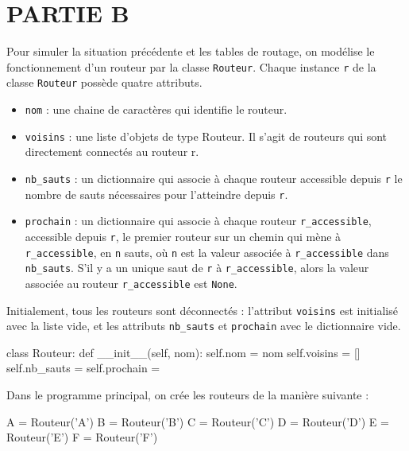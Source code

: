 \medskip

\section*{PARTIE B}

\medskip

Pour simuler la situation précédente et les tables de routage, on modélise le fonctionnement d’un routeur par la classe \verb|Routeur|. Chaque instance \verb|r| de la classe \verb|Routeur| possède quatre attributs.

\begin{itemize}
    \item \verb|nom| : une chaine de caractères qui identifie le routeur.
    \item \verb|voisins| : une liste d’objets de type Routeur. Il s’agit de routeurs qui sont directement connectés au routeur r.
    \item \verb|nb_sauts| : un dictionnaire qui associe à chaque routeur accessible depuis \verb|r| le nombre de sauts nécessaires pour l’atteindre depuis \verb|r|.
    \item \verb|prochain| : un dictionnaire qui associe à chaque routeur \verb|r_accessible|, accessible depuis \verb|r|, le premier routeur sur un chemin qui mène à \verb|r_accessible|, en \verb|n| sauts, où \verb|n| est la valeur associée à \verb|r_accessible| dans \verb|nb_sauts|. S’il y a un unique saut de \verb|r| à \verb|r_accessible|, alors la valeur associée au routeur \verb|r_accessible| est \verb|None|.
\end{itemize}

Initialement, tous les routeurs sont déconnectés : l’attribut \verb|voisins| est initialisé avec la liste vide, et les attributs \verb|nb_sauts| et \verb|prochain| avec le dictionnaire vide.

\begin{CodePythontexAlt}[TaillePolice=\large, Largeur=1\linewidth,Centre,Lignes=true,PremLigne=1]{}
class Routeur: 
    def __init__(self, nom): 
        self.nom = nom
        self.voisins = []
        self.nb_sauts = {}
        self.prochain = {}
    \end{CodePythontexAlt}

Dans le programme principal, on crée les routeurs de la manière suivante :

\begin{CodePythontexAlt}[TaillePolice=\large, Largeur=1\linewidth,Centre,Lignes=true,PremLigne=1]{}
A = Routeur('A') 
B = Routeur('B') 
C = Routeur('C') 
D = Routeur('D') 
E = Routeur('E') 
F = Routeur('F')
    \end{CodePythontexAlt}

